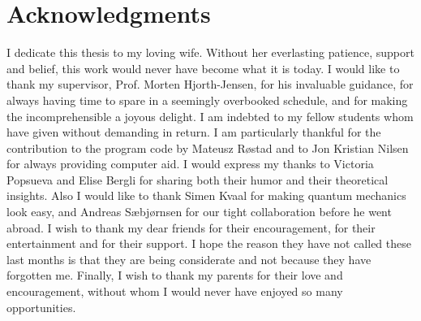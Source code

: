 \chapter*{Acknowledgments}

I dedicate this thesis to my loving wife. Without her everlasting
patience, support and belief, this work would never have become what
it is today.
\newline
%
\newline
I would like to thank my supervisor, Prof. Morten
Hjorth-Jensen, for his invaluable guidance, for always having time to
spare in a seemingly overbooked schedule, and for making the
incomprehensible a joyous delight. 
\newline
%
\newline
I am indebted to my fellow students whom have given without demanding
in return. I am particularly thankful for the contribution to the
program code by Mateusz R\o stad and to Jon Kristian Nilsen for always
providing computer aid. I would express my thanks to Victoria
Popsueva and Elise Bergli for sharing both their humor and 
their theoretical insights. Also I would like to thank Simen Kvaal for
making quantum mechanics look easy, and Andreas S\ae bj\o rnsen for
our tight collaboration before he went abroad. 
\newline
%
\newline
I wish to thank my dear friends for their encouragement, for their
entertainment and for their support. I hope the reason they have not
called these last months is that they are being considerate and not
because they have forgotten me.
\newline
%
\newline
Finally, I wish to thank my parents for their love and encouragement,
without whom I would never have enjoyed so many opportunities.
